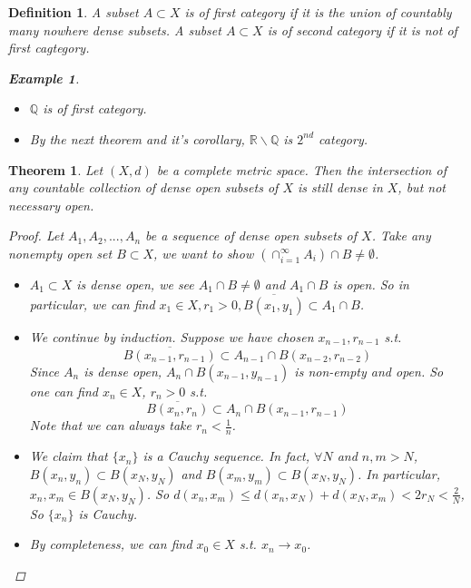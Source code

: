 \documentclass{article}
\newtheorem*{definition}{Definition}
\newtheorem*{example}{Example}
\newtheorem*{theorem}{Theorem}
\begin{document}
\begin{definition}
    A subset $A \subset X$ is of first category if it is the union of countably many nowhere dense subsets.
    A subset $A \subset X$ is of second category if it is not of first cagtegory.
    \begin{example} \hfill
        \begin{itemize}
            \item $\mathbb{Q}$ is of first category.
            \item By the next theorem and it's corollary, $\mathbb{R} \backslash \mathbb{Q}$ is $2^{nd}$ category.
        \end{itemize}
    \end{example}
\end{definition}
\begin{theorem}
    Let $(X, d)$ be a complete metric space. Then the intersection of any countable collection of dense open subsets of $X$
    is still dense in $X$, but not necessary open.
    \begin{proof}
        Let $A_1, A_2, ..., A_n$ be a sequence of dense open subsets of $X$.
        Take any nonempty open set  $B \subset X$, we want to show $(\cap_{i=1}^\infty A_i) \cap B \ne \emptyset$.
        \begin{itemize}
            \item $A_1 \subset X$ is dense open, we see $A_1 \cap B \ne \emptyset$ and $A_1 \cap B$ is open.
            So in particular, we can find $x_1 \in X, r_1 > 0, \overline{B(x_1, y_1)} \subset A_1 \cap B$. 
            \item We continue by induction.
            Suppose we have chosen $x_{n-1}, r_{n-1}$ s.t.
            \[
                \overline{B(x_{n-1}, r_{n-1})} \subset A_{n-1} \cap B(x_{n-2}, r_{n-2})
            \]
            Since $A_n$ is dense open, $A_n \cap B(x_{n-1}, y_{n-1})$ is non-empty and open.
            So one can find $x_n \in X$, $r_n > 0$ s.t.
            \[
                \overline{B(x_n, r_n)} \subset A_n \cap B(x_{n-1}, r_{n-1})
            \]
            Note that we can always take $r_n < \frac{1}{n}$.
            \item We claim that $\{x_n\}$ is a Cauchy sequence. In fact, $\forall N$ and
            $n, m > N$, $B(x_n, y_n) \subset B(x_N, y_N)$ and $B(x_m, y_m) \subset B(x_N, y_N)$.
            In particular, $x_n, x_m \in B(x_N, y_N)$.
            So $d(x_n, x_m) \le d(x_n, x_N) + d(x_N, x_m) < 2r_N < \frac{2}{N}$,
            So $\{x_n\}$ is Cauchy.
            \item By completeness, we can find $x_0 \in X$ s.t. $x_n \rightarrow x_0$.

\end{itemize}
\end{proof}
\end{theorem}
\end{document}
